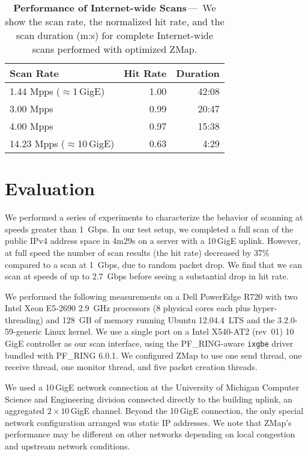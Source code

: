 \begin{table}\centering
    \begin{tabular}{lrr}
    \toprule
    \textbf{Scan Rate} & \textbf{Hit Rate} & \textbf{Duration} \\ \midrule
    1.44 Mpps ($\approx$1\,GigE)                 & 1.00  & 42:08               \\ 
    3.00 Mpps                  & 0.99  & 20:47              \\ 
    4.00 Mpps                  & 0.97  & 15:38              \\
    14.23 Mpps ($\approx$10\,GigE)                 &  0.63 &  4:29               \\ %
    \bottomrule
    \end{tabular}
\caption{\textbf{Performance of Internet-wide Scans}\,---\,%
We show the scan rate, the normalized hit rate, and the scan duration (m:s)
for complete Internet-wide scans performed with optimized ZMap.}
\label{tbl:fullhitrate}
\end{table}

\section{Evaluation}
\label{sec:evaluation}

We performed a series of experiments to characterize the behavior of scanning
at speeds greater than 1~Gbps. In our test setup, we completed a full scan of
the public IPv4 address space in 4m29s on a server with a 10\,GigE uplink.
However, at full speed the number of scan results (the hit rate) decreased by
37\% compared to a scan at 1~Gbps, due to random packet drop. We find that we
can scan at speeds of up to 2.7~Gbps before seeing a substantial drop in hit
rate.

We performed the following measurements on a Dell PowerEdge R720 with two
Intel Xeon E5-2690 2.9~GHz processors (8 physical cores each plus
hyper-threading) and 128~GB of memory running Ubuntu 12.04.4~LTS and the
3.2.0-59-generic Linux kernel. We use a single port on a Intel X540-AT2
(rev~01) 10\,GigE controller as our scan interface, using the PF\_RING-aware
\texttt{ixgbe} driver bundled with PF\_RING 6.0.1. We configured ZMap to use
one send thread, one receive thread, one monitor thread, and five packet
creation threads.

We used a 10\,GigE network connection at the University of Michigan Computer
Science and Engineering division connected directly to the building uplink,
an aggregated $2\times 10$\,GigE channel. Beyond the 10\,GigE connection, the
only special network configuration arranged was static IP addresses. We note
that ZMap's performance may be different on other networks depending on local
congestion and upstream network conditions.

